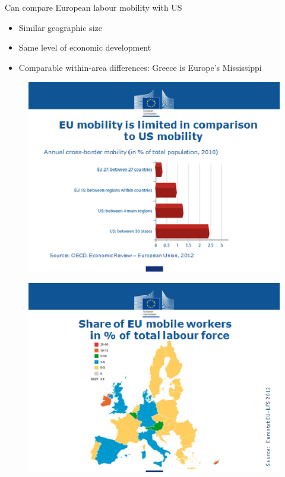 \documentclass{beamer}
\begin{document}
\begin{frame} 
  Can compare European labour mobility with US
  \begin{itemize}
    \item Similar geographic size
    \item Same level of economic development
    \item Comparable within-area differences: Greece is Europe's Mississippi
  \end{itemize}
\end{frame}

\begin{frame}
  \begin{figure}
    \includegraphics[scale=.7]{eu_labour.eps}
  \end{figure}
\end{frame}

\begin{frame}
  \begin{figure}
    \includegraphics[scale=.7]{eu_labour2.eps}
  \end{figure}
\end{frame}
\end{document}
